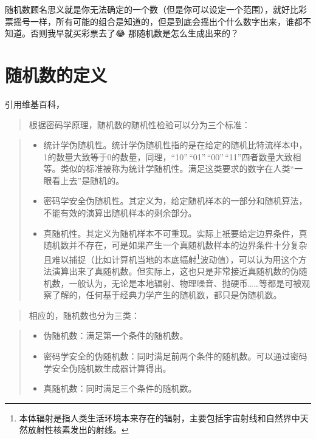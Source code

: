 \documentclass[12pt]{article}
\begin{document}
\makeblogtitle

随机数顾名思义就是你无法确定的一个数（但是你可以设定一个范围），就好比彩票摇号一样，所有可能的组合是知道的，但是到底会摇出个什么数字出来，谁都不知道。否则我早就买彩票去了😂 那随机数是怎么生成出来的？

\section{随机数的定义}\label{ux968fux673aux6570ux7684ux5b9aux4e49}

引用维基百科，

\begin{quote}
根据密码学原理，随机数的随机性检验可以分为三个标准：
\end{quote}

\begin{quote}
\begin{itemize}
\tightlist
\item
  统计学伪随机性。统计学伪随机性指的是在给定的随机比特流样本中，1的数量大致等于0的数量，同理，``10''\,``01''\,``00''\,``11''四者数量大致相等。类似的标准被称为统计学随机性。满足这类要求的数字在人类``一眼看上去''是随机的。
\item
  密码学安全伪随机性。其定义为，给定随机样本的一部分和随机算法，不能有效的演算出随机样本的剩余部分。
\item
  真随机性。其定义为随机样本不可重现。实际上衹要给定边界条件，真随机数并不存在，可是如果产生一个真随机数样本的边界条件十分复杂且难以捕捉（比如计算机当地的本底辐射\footnote{本体辐射是指人类生活环境本来存在的辐射，主要包括宇宙射线和自然界中天然放射性核素发出的射线。}波动值），可以认为用这个方法演算出来了真随机数。但实际上，这也只是非常接近真随机数的伪随机数，一般认为，无论是本地辐射、物理噪音、抛硬币\ldots\ldots 等都是可被观察了解的，任何基于经典力学产生的随机数，都只是伪随机数。
\end{itemize}
\end{quote}

\begin{quote}
相应的，随机数也分为三类：
\end{quote}

\begin{quote}
\begin{itemize}
\tightlist
\item
  伪随机数：满足第一个条件的随机数。
\item
  密码学安全的伪随机数：同时满足前两个条件的随机数。可以通过密码学安全伪随机数生成器计算得出。
\item
  真随机数：同时满足三个条件的随机数。
\end{itemize}
\end{quote}
\end{document}
